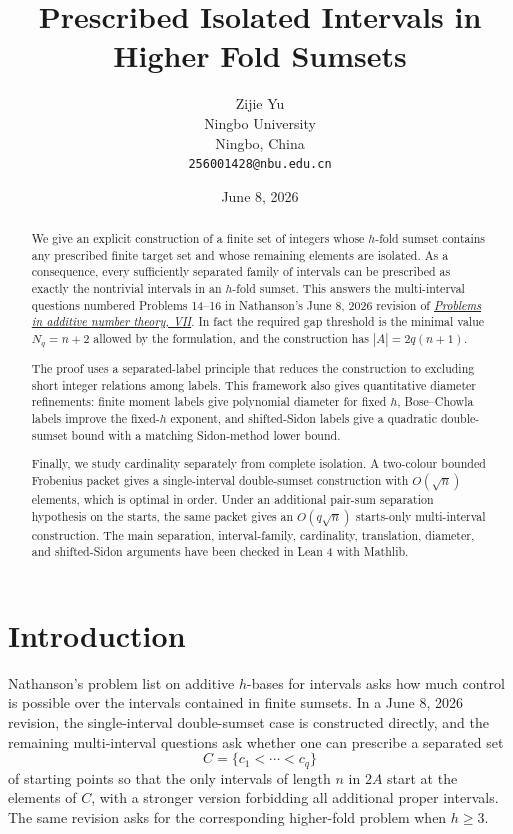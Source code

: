 \documentclass[11pt]{article}
\title{Prescribed Isolated Intervals in Higher Fold Sumsets}
\author{Zijie Yu\\
Ningbo University\\
Ningbo, China\\
\texttt{256001428@nbu.edu.cn}}
\date{June 8, 2026}
\begin{document}
\maketitle

\begin{abstract}
We give an explicit construction of a finite set of integers whose $h$-fold
sumset contains any prescribed finite target set and whose remaining elements
are isolated. As a consequence, every sufficiently separated family of
intervals can be prescribed as exactly the nontrivial intervals in an
$h$-fold sumset. This answers the multi-interval questions numbered
Problems 14--16 in Nathanson's June 8, 2026 revision of
\href{https://arxiv.org/abs/2605.26425}{\emph{Problems in additive number
theory, VII}}. In fact the required gap threshold is the minimal value
$N_q=n+2$ allowed by the formulation, and the construction has
$|A|=2q(n+1)$.

The proof uses a separated-label principle that reduces the construction to
excluding short integer relations among labels. This framework also gives
quantitative diameter refinements: finite moment labels give polynomial
diameter for fixed $h$, Bose--Chowla labels improve the fixed-$h$ exponent,
and shifted-Sidon labels give a quadratic double-sumset bound with a matching
Sidon-method lower bound.

Finally, we study cardinality separately from complete isolation. A two-colour
bounded Frobenius packet gives a single-interval double-sumset construction
with $O(\sqrt n)$ elements, which is optimal in order. Under an additional
pair-sum separation hypothesis on the starts, the same packet gives an
$O(q\sqrt n)$ starts-only multi-interval construction. The main separation,
interval-family, cardinality, translation, diameter, and shifted-Sidon
arguments have been checked in Lean 4 with Mathlib.
\end{abstract}

\section{Introduction}

Nathanson's problem list on additive $h$-bases for intervals asks how much
control is possible over the intervals contained in finite sumsets. In a
June 8, 2026 revision, the single-interval double-sumset case is constructed
directly, and the remaining multi-interval questions ask whether one can
prescribe a separated set
\[
 C=\{c_1<\cdots<c_q\}
\]
of starting points so that the only intervals of length $n$ in $2A$ start at
the elements of $C$, with a stronger version forbidding all additional
proper intervals. The same revision asks for the corresponding higher-fold
problem when $h\geq 3$.
\end{document}
